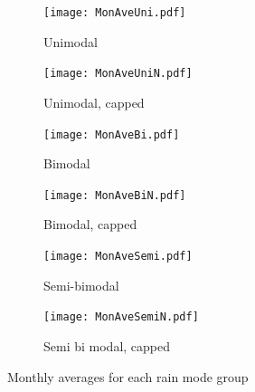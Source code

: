 \documentclass{article}
\begin{document}
	\begin{figure}[H]
		\centering
		\begin{subfigure}{0.5\textwidth}
			\centering
			\texttt{[image: MonAveUni.pdf]}
			\caption{Unimodal}
		\end{subfigure}%
		\begin{subfigure}{0.5\textwidth}
			\centering
			\texttt{[image: MonAveUniN.pdf]}
			\caption{Unimodal, capped}
		\end{subfigure}
		\begin{subfigure}{0.5\textwidth}
			\centering
			\texttt{[image: MonAveBi.pdf]}
			\caption{Bimodal}
		\end{subfigure}%
		\begin{subfigure}{0.5\textwidth}
			\centering
			\texttt{[image: MonAveBiN.pdf]}
			\caption{Bimodal, capped}
		\end{subfigure}
		\begin{subfigure}{0.5\textwidth}
			\centering
			\texttt{[image: MonAveSemi.pdf]}
			\caption{Semi-bimodal}
		\end{subfigure}%
		\begin{subfigure}{0.5\textwidth}
			\centering
			\texttt{[image: MonAveSemiN.pdf]}
			\caption{Semi bi modal, capped}
		\end{subfigure}
		\caption{Monthly averages for each rain mode group}
		\label{MonAvegroups}
	\end{figure}
\end{document}
